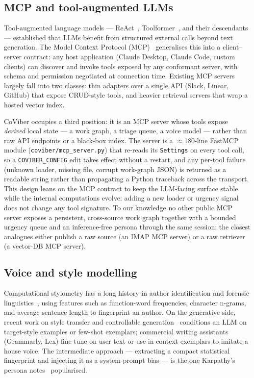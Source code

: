 \subsection{MCP and tool-augmented LLMs}
\label{sec:related:mcp}

Tool-augmented language models --- ReAct~\cite{TODO-react-yao-2022}, Toolformer~\cite{TODO-toolformer}, and their descendants --- established that LLMs benefit from structured external calls beyond text generation. The Model Context Protocol (MCP)~\cite{TODO-mcp-spec} generalises this into a client--server contract: any host application (Claude Desktop, Claude Code, custom clients) can discover and invoke tools exposed by any conformant server, with schema and permission negotiated at connection time. Existing MCP servers largely fall into two classes: thin adapters over a single API (Slack, Linear, GitHub) that expose CRUD-style tools, and heavier retrieval servers that wrap a hosted vector index.

CoViber occupies a third position: it is an MCP server whose tools expose \emph{derived} local state --- a work graph, a triage queue, a voice model --- rather than raw API endpoints or a black-box index. The server is a $\approx$180-line FastMCP module (\texttt{coviber/mcp\_server.py}) that re-reads its \texttt{Settings} on every tool call, so a \texttt{COVIBER\_CONFIG} edit takes effect without a restart, and any per-tool failure (unknown loader, missing file, corrupt work-graph JSON) is returned as a readable string rather than propagating a Python traceback across the transport. This design leans on the MCP contract to keep the LLM-facing surface stable while the internal computations evolve: adding a new loader or urgency signal does not change any tool signature. To our knowledge no other public MCP server exposes a persistent, cross-source work graph together with a bounded urgency queue and an inference-free persona through the same session; the closest analogues either publish a raw source (an IMAP MCP server) or a raw retriever (a vector-DB MCP server).

\subsection{Voice and style modelling}
\label{sec:related:voice}

Computational stylometry has a long history in author identification and forensic linguistics~\cite{TODO-stylometry-koppel,TODO-stamatatos-survey}, using features such as function-word frequencies, character n-grams, and average sentence length to fingerprint an author. On the generative side, recent work on style transfer and controllable generation~\cite{TODO-style-transfer-lample,TODO-controllable-generation} conditions an LLM on target-style examples or few-shot exemplars; commercial writing assistants (Grammarly, Lex) fine-tune on user text or use in-context exemplars to imitate a house voice. The intermediate approach --- extracting a compact statistical fingerprint and injecting it as a system-prompt bias --- is the one Karpathy's persona notes~\cite{TODO-karpathy-persona} popularised.

